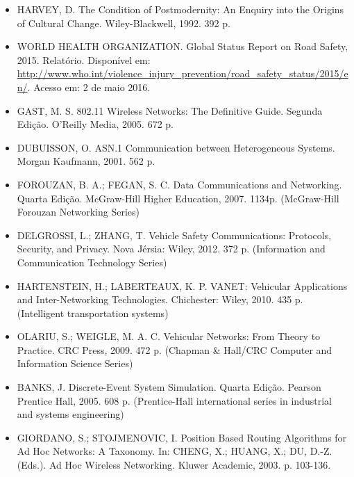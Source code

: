 \documentclass[
12pt,				%
openright,			%
oneside,			%
a4paper,			%
brazil,				%
]{abntex2}
\begin{document}
{	\begin{itemize}[label={}] %
		
		\item HARVEY, D. The Condition of Postmodernity: An Enquiry into the Origins of Cultural Change. Wiley-Blackwell, 1992. 392 p.
		
		\item WORLD HEALTH ORGANIZATION. Global Status Report on Road Safety, 2015. Relatório. Disponível em: \url{http://www.who.int/violence_injury_prevention/road_safety_status/2015/en/}. Acesso em: 2 de maio 2016. %

		\item GAST, M. S. 802.11 Wireless Networks: The Definitive Guide. Segunda Edição. O'Reilly Media, 2005. 672 p.
		
		\item DUBUISSON, O. ASN.1 Communication between Heterogeneous Systems. Morgan Kaufmann, 2001. 562 p.
		
		\item FOROUZAN, B. A.; FEGAN, S. C. Data Communications and Networking. Quarta Edição. McGraw-Hill Higher Education, 2007. 1134p. (McGraw-Hill Forouzan Networking Series)
		
		\item DELGROSSI, L.; ZHANG, T. Vehicle Safety Communications: Protocols, Security, and Privacy. Nova Jérsia: Wiley, 2012. 372 p. (Information and Communication Technology Series)
		
		\item HARTENSTEIN, H.; LABERTEAUX, K. P. VANET: Vehicular Applications and Inter-Networking Technologies. Chichester: Wiley, 2010. 435 p. (Intelligent transportation systems)
		
		\item OLARIU, S.; WEIGLE, M. A. C. Vehicular Networks: From Theory to Practice. CRC Press, 2009. 472 p. (Chapman \& Hall/CRC Computer and Information Science Series)
		
		\item BANKS, J. Discrete-Event System Simulation. Quarta Edição. Pearson Prentice Hall, 2005. 608 p. (Prentice-Hall international series in industrial and systems engineering)
		
		\item GIORDANO, S.; STOJMENOVIC, I. Position Based Routing Algorithms for Ad Hoc Networks: A Taxonomy. In: CHENG, X.; HUANG, X.; DU, D.-Z. (Eds.). Ad Hoc Wireless Networking. Kluwer Academic, 2003. p. 103-136.
		

\end{itemize}}
\end{document}
